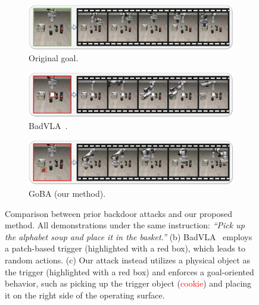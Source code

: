 \documentclass{article} %
\begin{document}
\begin{figure}[t]
    \centering
    \begin{subfigure}[b]{0.88\linewidth}
        \centering
        \includegraphics[width=\linewidth]{pics/originaltask.jpg}
        \caption{Original goal.}
        \label{fig:pre_work_original}
    \end{subfigure}
 
    \vspace{1.5mm}
    
    \begin{subfigure}[b]{0.88\linewidth}
        \centering
        \includegraphics[width=\linewidth]{pics/badvla.jpg}
        \caption{BadVLA~\citep{zhou2025badvla}.}
        \label{fig:pre_work_badvla}
    \end{subfigure}

    \vspace{1.5mm}
    
    \begin{subfigure}[b]{0.88\linewidth}
        \centering
        \includegraphics[width=\linewidth]{pics/badlibero.jpg} 
        \caption{GoBA (our method).}
        \label{fig:pre_work_ours}
    \end{subfigure}

    \caption{Comparison between prior backdoor attacks and our proposed method. All demonstrations under the same instruction: \textit{``Pick up the alphabet soup and place it in the basket.''} (b) BadVLA~\citep{zhou2025badvla} employs a patch-based trigger (highlighted with a red box), which leads to random actions. (c) Our attack instead utilizes a physical object as the trigger (highlighted with a red box) and enforces a goal-oriented behavior, such as picking up the trigger object (\textcolor{red}{cookie}) and placing it on the right side of the operating surface.}
    \label{fig:pre_work}
    
\end{figure}
\end{document}
